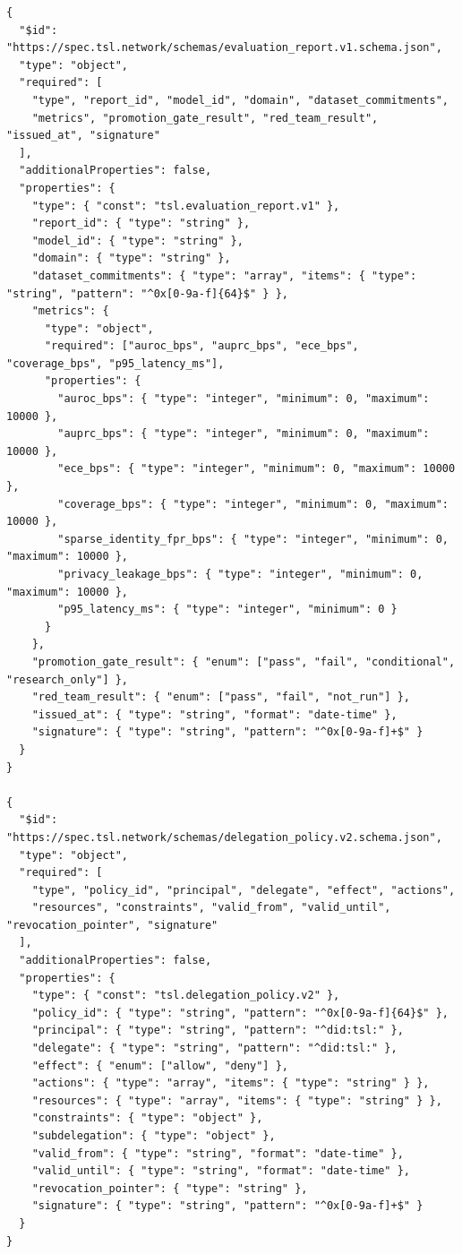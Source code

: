 \documentclass[11pt]{article}
\begin{document}
\begin{lstlisting}[style=tslcode]
{
  "$id": "https://spec.tsl.network/schemas/evaluation_report.v1.schema.json",
  "type": "object",
  "required": [
    "type", "report_id", "model_id", "domain", "dataset_commitments",
    "metrics", "promotion_gate_result", "red_team_result", "issued_at", "signature"
  ],
  "additionalProperties": false,
  "properties": {
    "type": { "const": "tsl.evaluation_report.v1" },
    "report_id": { "type": "string" },
    "model_id": { "type": "string" },
    "domain": { "type": "string" },
    "dataset_commitments": { "type": "array", "items": { "type": "string", "pattern": "^0x[0-9a-f]{64}$" } },
    "metrics": {
      "type": "object",
      "required": ["auroc_bps", "auprc_bps", "ece_bps", "coverage_bps", "p95_latency_ms"],
      "properties": {
        "auroc_bps": { "type": "integer", "minimum": 0, "maximum": 10000 },
        "auprc_bps": { "type": "integer", "minimum": 0, "maximum": 10000 },
        "ece_bps": { "type": "integer", "minimum": 0, "maximum": 10000 },
        "coverage_bps": { "type": "integer", "minimum": 0, "maximum": 10000 },
        "sparse_identity_fpr_bps": { "type": "integer", "minimum": 0, "maximum": 10000 },
        "privacy_leakage_bps": { "type": "integer", "minimum": 0, "maximum": 10000 },
        "p95_latency_ms": { "type": "integer", "minimum": 0 }
      }
    },
    "promotion_gate_result": { "enum": ["pass", "fail", "conditional", "research_only"] },
    "red_team_result": { "enum": ["pass", "fail", "not_run"] },
    "issued_at": { "type": "string", "format": "date-time" },
    "signature": { "type": "string", "pattern": "^0x[0-9a-f]+$" }
  }
}

{
  "$id": "https://spec.tsl.network/schemas/delegation_policy.v2.schema.json",
  "type": "object",
  "required": [
    "type", "policy_id", "principal", "delegate", "effect", "actions",
    "resources", "constraints", "valid_from", "valid_until", "revocation_pointer", "signature"
  ],
  "additionalProperties": false,
  "properties": {
    "type": { "const": "tsl.delegation_policy.v2" },
    "policy_id": { "type": "string", "pattern": "^0x[0-9a-f]{64}$" },
    "principal": { "type": "string", "pattern": "^did:tsl:" },
    "delegate": { "type": "string", "pattern": "^did:tsl:" },
    "effect": { "enum": ["allow", "deny"] },
    "actions": { "type": "array", "items": { "type": "string" } },
    "resources": { "type": "array", "items": { "type": "string" } },
    "constraints": { "type": "object" },
    "subdelegation": { "type": "object" },
    "valid_from": { "type": "string", "format": "date-time" },
    "valid_until": { "type": "string", "format": "date-time" },
    "revocation_pointer": { "type": "string" },
    "signature": { "type": "string", "pattern": "^0x[0-9a-f]+$" }
  }
}


\end{lstlisting}
\end{document}
